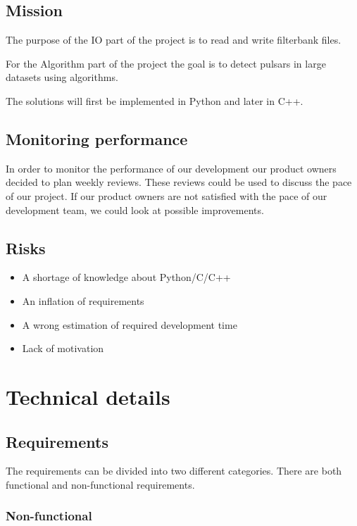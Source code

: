 \documentclass[a4paper,11pt]{report}
\begin{document}
    \section{Mission}
    
    The purpose of the IO part of the project is to read and write filterbank files.

	For the Algorithm part of the project the goal is to detect pulsars in large datasets using algorithms.

	The solutions will first be implemented in Python and later in C++.
    
    \section{Monitoring performance}
    
    In order to monitor the performance of our development our product owners decided to plan weekly reviews. These reviews could be used to discuss the pace of our project. 
    If our product owners are not satisfied with the pace of our development team, we could look at possible improvements.
    
    \section{Risks}
    
    \begin{itemize}
        \item A shortage of knowledge about Python/C/C++
        \item An inflation of requirements
        \item A wrong estimation of required development time
        \item Lack of motivation
    \end{itemize}
    
    \chapter{Technical details}
    
    \section{Requirements}
    
    The requirements can be divided into two different categories. There are both functional and non-functional requirements.
    
    \subsection{Non-functional}
    
\end{document}
